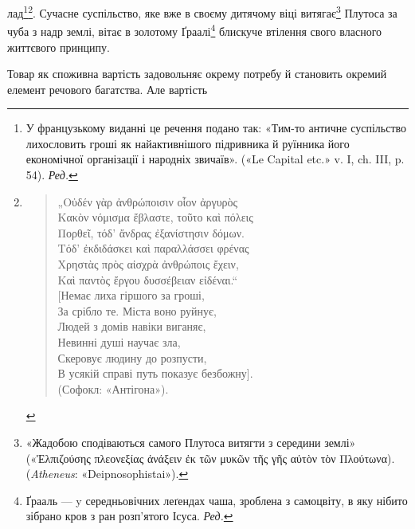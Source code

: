 лад\footnote*{
У французькому виданні це речення подано так: «Тим-то
античне суспільство лихословить гроші як найактивнішого підривника й руїнника
його економічної організації і народніх звичаїв». («Le Capital etc.» v. I,
ch. III, p. 54). \emph{Ред.}
}\footnote{
\begin{verse}
\vspace{-\dimexpr\baselineskip+\topsep}
\textgreek{„Οὐδέν γὰρ ἀνθρώποισιν οἷον ἀργυρὸς \\
Κακὸν νόμισμα ἔβλαστε, τοῦτο καὶ πόλεις \\
Πορθεῖ, τόδ’ ἄνδρας ἐξανίστησιν δόμων. \\
Τόδ’ ἐκδιδάσκει καὶ παραλλάσσει φρένας \\
Χρηστὰς πρὸς αἰσχρὰ ἀνθρώποις ἔχειν, \\
Καὶ παντὸς ἔργου δυσσέβειαν εἰδέναι.“} \\
\hspace{2em}[Немає лиха гіршого за гроші, \\
\hspace{2em}За срібло те. Міста воно руйнує, \\
\hspace{2em}Людей з домів навіки виганяє, \\
\hspace{2em}Невинні душі научає зла, \\
\hspace{2em}Скеровує людину до розпусти, \\
\hspace{2em}В усякій справі путь показує безбожну]. \\
\hspace{4em}(Софокл: «Антігона»).
\end{verse}
}. Сучасне суспільство, яке вже в своєму дитячому
віці витягає\footnote{
«Жадобою сподіваються самого Плутоса витягти з середини землі»
(«\textgreek{Ἐλπιζούσης  πλεονεξίας ἀνάξειν ἐκ τῶν μυκῶν τῆς γῆς αὐτὸν τὸν Πλούτωνα}). (\emph{Atheneus}:
«Deipnosophistai»).
} Плутоса за чуба з надр землі, вітає в золотому
Ґраалі\footnote*{
Ґрааль — y середньовічних леґендах чаша, зроблена з самоцвіту,
в яку нібито зібрано кров з ран розп’ятого Ісуса. \emph{Ред.}
} блискуче втілення свого власного життєвого принципу.

Товар як споживна вартість задовольняє окрему потребу й
становить окремий елемент речового багатства. Але вартість
\parbreak{}  %
